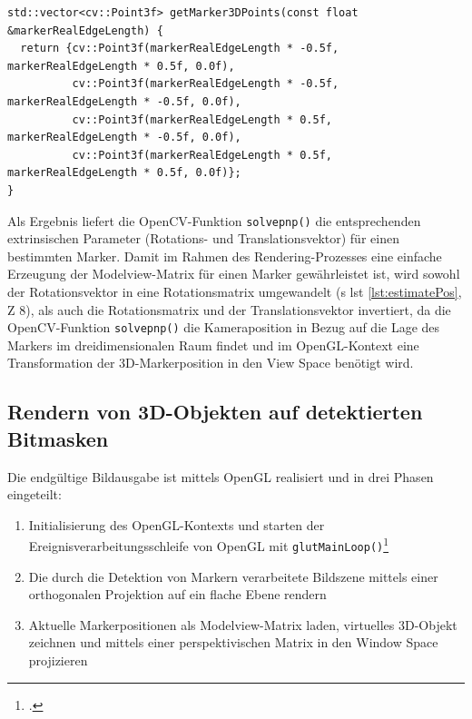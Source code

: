 \begin{lstlisting}[caption={Die Funktion \texttt{detectormarkerbased.cpp/getMarker3DPoints();} bestimmt die Position eines Markers im dreidimensionalen Raum}, label={lst:getMarker3DPoints}]
std::vector<cv::Point3f> getMarker3DPoints(const float &markerRealEdgeLength) {
  return {cv::Point3f(markerRealEdgeLength * -0.5f, markerRealEdgeLength * 0.5f, 0.0f),
          cv::Point3f(markerRealEdgeLength * -0.5f, markerRealEdgeLength * -0.5f, 0.0f),
          cv::Point3f(markerRealEdgeLength * 0.5f, markerRealEdgeLength * -0.5f, 0.0f),
          cv::Point3f(markerRealEdgeLength * 0.5f, markerRealEdgeLength * 0.5f, 0.0f)};
}
\end{lstlisting}

\noindent Als Ergebnis liefert die OpenCV-Funktion \texttt{solvepnp()} die entsprechenden extrinsischen Parameter (Rotations- und Translationsvektor) für einen bestimmten Marker. Damit im Rahmen des Rendering-Prozesses eine einfache Erzeugung der Modelview-Matrix für einen Marker gewährleistet ist, wird sowohl der Rotationsvektor in eine Rotationsmatrix umgewandelt (\acs{s} \acs{lst} \ref{lst:estimatePos}, \acs{Z} 8), als auch die Rotationsmatrix und der Translationsvektor invertiert, da die OpenCV-Funktion \texttt{solvepnp()} die Kameraposition in Bezug auf die Lage des Markers im dreidimensionalen Raum findet und im OpenGL-Kontext eine Transformation der 3D-Markerposition in den View Space benötigt wird.

\subsection{Rendern von 3D-Objekten auf detektierten Bitmasken}
Die endgültige Bildausgabe ist mittels OpenGL realisiert und in drei Phasen eingeteilt:

\begin{enumerate}
\item Initialisierung des OpenGL-Kontexts und starten der Ereignisverarbeitungsschleife von OpenGL mit \texttt{glutMainLoop()}\footcite{openglglutMainLoop}
\item Die durch die Detektion von Markern verarbeitete Bildszene mittels einer orthogonalen Projektion auf ein flache Ebene rendern
\item Aktuelle Markerpositionen als Modelview-Matrix laden, virtuelles 3D-Objekt zeichnen und mittels einer perspektivischen Matrix in den Window Space projizieren
\end{enumerate}

